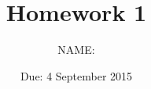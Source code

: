 
         \newcommand\alg[1]{\ensuremath{\mathbf{#1}}}
         \newcommand{\<}{\ensuremath{\langle}}
         \renewcommand{\>}{\ensuremath{\rangle}}
         \newcommand\fld[1]{\ensuremath{\mathbb{#1}}}


         \newcommand\vx{\vec{x}}
         \newcommand\vy{\vec{y}}
         \newcommand\vz{\vec{z}}
         \newcommand\vv{\vec{v}}
         \newcommand\vw{\vec{w}}
         \newcommand\Span{\ensuremath{\operatorname{Span}}}

         \author{NAME:}
         \title{Homework 1}
         \date{Due: 4 September 2015}



\maketitle


